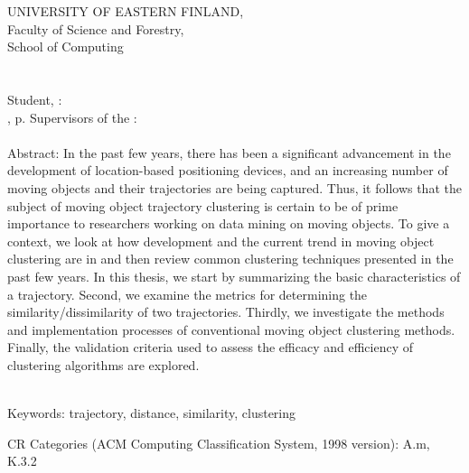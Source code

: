 \thispagestyle{empty}

\begin{spacing}{1.0}
\newpage


UNIVERSITY OF EASTERN FINLAND, \\ Faculty of Science and Forestry, \campus \\ School of Computing \\
\facultyschooleng \\ \\
Student, \authorname : \thesistitle \\
\documenttypeeng , \mypagecount p.
Supervisors of the \documenttypeeng : \supervisorseng \\
\ajankohtaenglish \\

Abstract: In the past few years, there has been a significant advancement in the development of location-based positioning devices, and an increasing number of moving objects and their trajectories are being captured. Thus, it follows that the subject of moving object trajectory clustering is certain to be of prime importance to researchers working on data mining on moving objects. To give a context, we look at how development and the current trend in moving object clustering are in and then review common clustering techniques presented in the past few years.  In this thesis, we start by summarizing the basic characteristics of a trajectory. Second, we examine the metrics for determining the similarity/dissimilarity of two trajectories. Thirdly, we investigate the methods and implementation processes of conventional moving object clustering methods. Finally, the validation criteria used to assess the efficacy and efficiency of clustering algorithms are explored. 


~\\ %
Keywords:
trajectory, distance, similarity, clustering




CR Categories (ACM Computing Classification System,
1998 version): A.m, K.3.2\\

\end{spacing}

